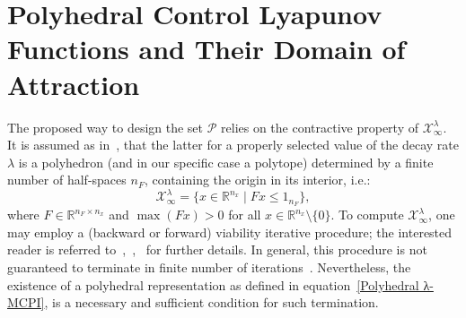 \documentclass[letterpaper, 10 pt, conference]{ieeeconf}  %
\newcommand{\R}{\mathbb{R}}
\newcommand{\mc}[1]{\mathcal{#1}}
\begin{document}
\section{Polyhedral Control Lyapunov Functions and Their Domain of Attraction}

The proposed way to design the set $\mc{P}$ relies on the contractive property of $\mc{X}^{\lambda}_{\infty}$. It is assumed as in~\cite{Grammatico2012PCLF}, that the latter for a properly selected value of the decay rate $\lambda$ is a polyhedron (and in our specific case a polytope) determined by a finite number of half-spaces $n_F$, containing the origin in its interior, i.e.:
\begin{equation}\label{Polyhedral λ-MCPI}
\mc{X}^{\lambda}_{\infty} = \{x \in \R^{n_x} \mid Fx \leq 1_{n_F}\},
\end{equation}
where $F \in \R^{n_F \times n_x}$ and $\max(Fx) > 0$ for all $x \in \R^{n_x} \setminus \{0\}$. 
To compute $\mc{X}^{\lambda}_{\infty}$, one may employ a (backward or forward) viability iterative procedure; the interested reader is referred to~\cite{Blanchini1994UltimateBounded},~\cite{Blanchini2008SetTheoreticMethods},~\cite{Miani2005MAXISG} for further details. 
In general, this procedure is not guaranteed to terminate in finite number of iterations~\cite{Kerrigan2000InvariantSetsinMPC}. Nevertheless, the existence of a polyhedral representation as defined in equation~\eqref{Polyhedral λ-MCPI}, is a necessary and sufficient condition for such termination.
\end{document}

